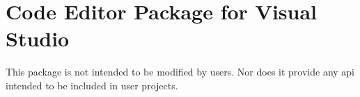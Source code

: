 \chapter{Code Editor Package for Visual Studio}
\hypertarget{md__hey_tea_9_2_library_2_package_cache_2com_8unity_8ide_8visualstudio_0d2_80_820_2_documentation_0i_2_r_e_a_d_m_e}{}\label{md__hey_tea_9_2_library_2_package_cache_2com_8unity_8ide_8visualstudio_0d2_80_820_2_documentation_0i_2_r_e_a_d_m_e}
\label{md__hey_tea_9_2_library_2_package_cache_2com_8unity_8ide_8visualstudio_0d2_80_820_2_documentation_0i_2_r_e_a_d_m_e_autotoc_md1004}%
%
 This package is not intended to be modified by users. Nor does it provide any api intended to be included in user projects. 